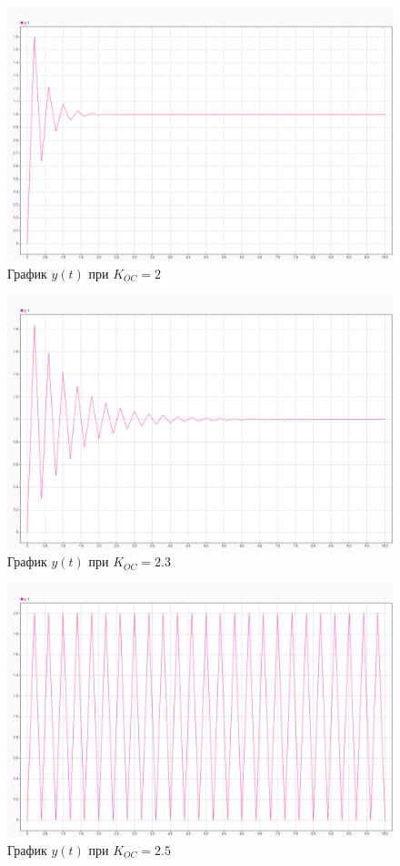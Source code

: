 \begin{figure}[H]
    \centering
\includegraphics[width=1.\linewidth,center]{assets/images/2.png}
    \caption{График $y(t)$ при $K_{OC} = 2$}
    \label{fig:p2}
\end{figure}


\begin{figure}[H]
    \centering
\includegraphics[width=1.\linewidth,center]{assets/images/3.png}
    \caption{График $y(t)$ при $K_{OC} = 2.3$}
    \label{fig:p3}
\end{figure}


\begin{figure}[H]
    \centering
\includegraphics[width=1.\linewidth,center]{assets/images/4.png}
    \caption{График $y(t)$ при $K_{OC} = 2.5$}
    \label{fig:p4}
\end{figure}

